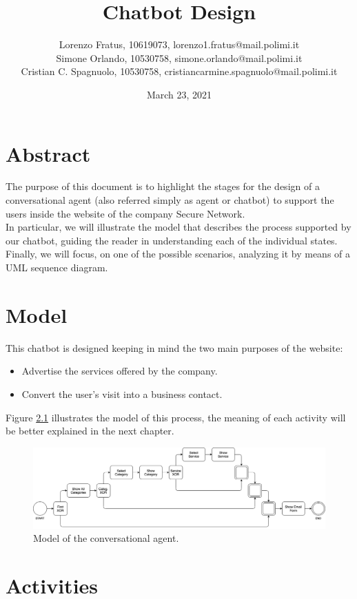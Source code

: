 \documentclass[12pt]{report}
\title{Chatbot Design}
\author{Lorenzo Fratus, 10619073, lorenzo1.fratus@mail.polimi.it \\
Simone Orlando, 10530758, simone.orlando@mail.polimi.it \\
Cristian C. Spagnuolo, 10530758, cristiancarmine.spagnuolo@mail.polimi.it}
\date{March 23, 2021}
\begin{document}
\maketitle
\tableofcontents

\chapter{Abstract}
The purpose of this document is to highlight the stages for the 
design of a conversational agent (also referred simply as agent or chatbot) to support 
the users inside the website of the company Secure Network.\\
In particular, we will illustrate the model that describes the process
supported by our chatbot, guiding the reader in understanding each of
the individual states.\\
Finally, we will focus, on one of the possible scenarios, analyzing
it by means of a UML sequence diagram.

\chapter{Model}
This chatbot is designed keeping in mind the two main purposes of the
website:
\begin{itemize}
	\item Advertise the services offered by the company.
	\item Convert the user's visit into a business contact. 
\end{itemize}

Figure \ref{fig:model} illustrates the model of this process, the 
meaning of each activity will be better explained in the next chapter.

\begin{figure}[h]
	\centering
	\includegraphics[width=\textwidth]{model}
	\caption{Model of the conversational agent.}
	\label{fig:model}
\end{figure}

\chapter{Activities}
\end{document}
